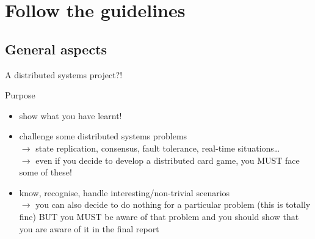 \documentclass[presentation]{beamer}\mode<presentation>{\usetheme{AMSBolognaFC}}
\begin{document}
\section{Follow the guidelines}

\subsection{General aspects}

\begin{frame}[c,allowframebreaks]{A distributed systems project?!}
    
    \begin{block}{Purpose}
        \begin{itemize}
            \item show what you have learnt!
            \item challenge some distributed systems problems
            \\
            $\rightarrow$ state replication, consensus, fault tolerance, real-time situations\dots
            \\
            $\rightarrow$ even if you decide to develop a distributed card game, you \alert{MUST} face some of these!
            \item know, recognise, handle interesting/non-trivial scenarios
            \\
            $\rightarrow$ you can also decide to do nothing for a particular problem (this is totally fine) \alert{BUT} you \alert{MUST} be aware of that problem and you should show that you are aware of it in the final report
        \end{itemize}
    \end{block}
    
    \framebreak
    

\end{frame}
\end{document}
